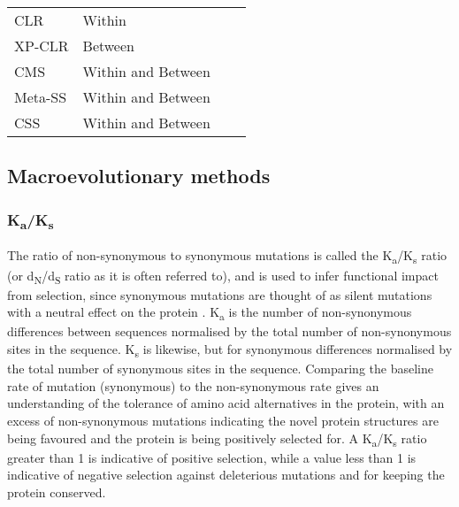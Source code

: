 \documentclass[twoside,openright]{report}
\begin{document}
\begin{table}
\begin{tabular}[t]{l>{\raggedright\arraybackslash}p{10em}ll}
\hspace{1em}CLR & Within &  & \citet{Kim2002}\\
\hspace{1em}XP-CLR & Between &  & \citet{Chen2010}\\
\hspace{1em}CMS & Within and Between &  & \citet{Grossman2010}\\
\hspace{1em}Meta-SS & Within and Between &  & \citet{Utsunomiya2015}\\
\hspace{1em}CSS & Within and Between &  & \citet{Randhawa2014}\\
\bottomrule
\end{tabular}
\end{table}

\subsection{Macroevolutionary methods}\label{macroevolutionary-methods}

\subsubsection{\texorpdfstring{K\textsubscript{a}/K\textsubscript{s}}{Ka/Ks}}\label{kaks}

The ratio of non-synonymous to synonymous mutations is called the
K\textsubscript{a}/K\textsubscript{s} ratio (or
d\textsubscript{N}/d\textsubscript{S} ratio as it is often referred to),
and is used to infer functional impact from selection, since synonymous
mutations are thought of as silent mutations with a neutral effect on
the protein \citep{Hughes1988}. K\textsubscript{a} is the number of
non-synonymous differences between sequences normalised by the total
number of non-synonymous sites in the sequence. K\textsubscript{s} is
likewise, but for synonymous differences normalised by the total number
of synonymous sites in the sequence. Comparing the baseline rate of
mutation (synonymous) to the non-synonymous rate gives an understanding
of the tolerance of amino acid alternatives in the protein, with an
excess of non-synonymous mutations indicating the novel protein
structures are being favoured and the protein is being positively
selected for. A K\textsubscript{a}/K\textsubscript{s} ratio greater than
1 is indicative of positive selection, while a value less than 1 is
indicative of negative selection against deleterious mutations and for
keeping the protein conserved.
\end{document}

